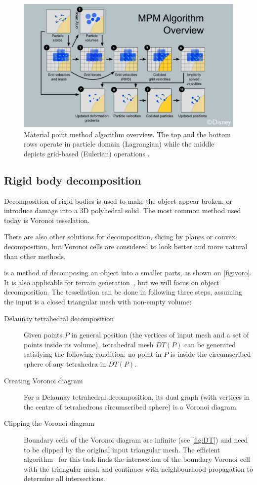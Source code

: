\begin{figure}
\centering
\includegraphics[width=\textwidth]{img/MPM}
\caption{Material point method algorithm overview. The top and the bottom rows operate in particle domain (Lagrangian) while the middle depicts grid-based (Eulerian) operations \cite{disney}.
}
\label{fig:mpm}
\end{figure}

\subsection{Rigid body decomposition}

Decomposition of rigid bodies is used to make the object appear broken, or introduce damage into a 3D polyhedral solid. The most common method used today is Voronoi tesselation.

There are also other solutions for decomposition, \eg slicing by planes or convex decomposition, but Voronoi cells are considered to look better and more natural than other methods. 

 is a method of decomposing an object into a smaller parts, as shown on \cref{fig:voro}. It is also applicable for \eg terrain generation~\cite{voronoiterrainrealtime}, but we will focus on object decomposition. The tessellation can be done in following three steps, assuming the input is a closed triangular mesh with non-empty volume:
\begin{description}
    \item[Delaunay tetrahedral decomposition] Given points $P$ in general position (the vertices of input mesh and a set of points inside its volume), tetrahedral mesh $DT(P)$ can be generated satisfying the following condition: no point in $P$ is inside the circumscribed sphere of any tetrahedra in $DT(P)$.
    \item[Creating Voronoi diagram] For a Delaunay tetrahedral decomposition, its dual graph (with vertices in the centre of tetrahedrons circumscribed sphere) is a Voronoi diagram.
    \item[Clipping the Voronoi diagram] Boundary cells of the Voronoi diagram are infinite (see \cref{fig:DT}) and need to be clipped by the original input triangular mesh. The efficient algorithm~\cite{yan2010efficient} for this task finds the intersection of the boundary Voronoi cell with the triangular mesh and continues with neighbourhood propagation to determine all intersections. 
\end{description}

